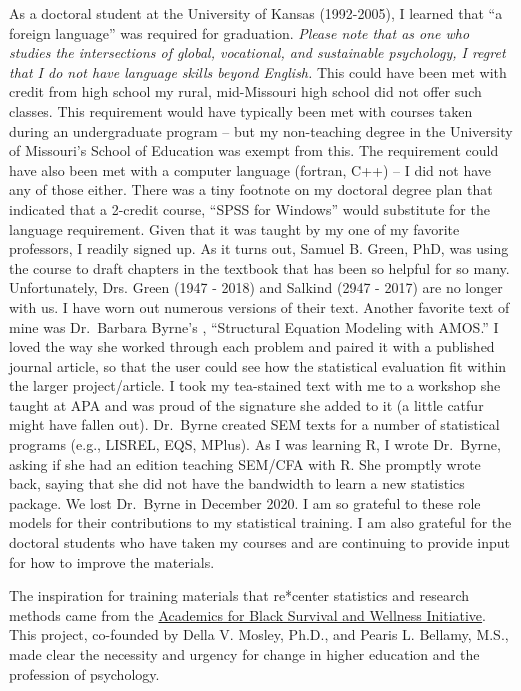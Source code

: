 \documentclass[
  english,
]{book}
\begin{document}
As a doctoral student at the University of Kansas (1992-2005), I learned that ``a foreign language'' was required for graduation. \emph{Please note that as one who studies the intersections of global, vocational, and sustainable psychology, I regret that I do not have language skills beyond English.} This could have been met with credit from high school my rural, mid-Missouri high school did not offer such classes. This requirement would have typically been met with courses taken during an undergraduate program -- but my non-teaching degree in the University of Missouri's School of Education was exempt from this. The requirement could have also been met with a computer language (fortran, C++) -- I did not have any of those either. There was a tiny footnote on my doctoral degree plan that indicated that a 2-credit course, ``SPSS for Windows'' would substitute for the language requirement. Given that it was taught by my one of my favorite professors, I readily signed up. As it turns out, Samuel B. Green, PhD, was using the course to draft chapters in the textbook \citep{green_using_2014} that has been so helpful for so many. Unfortunately, Drs. Green (1947 - 2018) and Salkind (2947 - 2017) are no longer with us. I have worn out numerous versions of their text. Another favorite text of mine was Dr.~Barbara Byrne's \citeyearpar{byrne_structural_2016}, ``Structural Equation Modeling with AMOS.'' I loved the way she worked through each problem and paired it with a published journal article, so that the user could see how the statistical evaluation fit within the larger project/article. I took my tea-stained text with me to a workshop she taught at APA and was proud of the signature she added to it (a little catfur might have fallen out). Dr.~Byrne created SEM texts for a number of statistical programs (e.g., LISREL, EQS, MPlus). As I was learning R, I wrote Dr.~Byrne, asking if she had an edition teaching SEM/CFA with R. She promptly wrote back, saying that she did not have the bandwidth to learn a new statistics package. We lost Dr.~Byrne in December 2020. I am so grateful to these role models for their contributions to my statistical training. I am also grateful for the doctoral students who have taken my courses and are continuing to provide input for how to improve the materials.

The inspiration for training materials that re*center statistics and research methods came from the \href{https://www.academics4blacklives.com/}{Academics for Black Survival and Wellness Initiative}. This project, co-founded by Della V. Mosley, Ph.D., and Pearis L. Bellamy, M.S., made clear the necessity and urgency for change in higher education and the profession of psychology.
\end{document}
